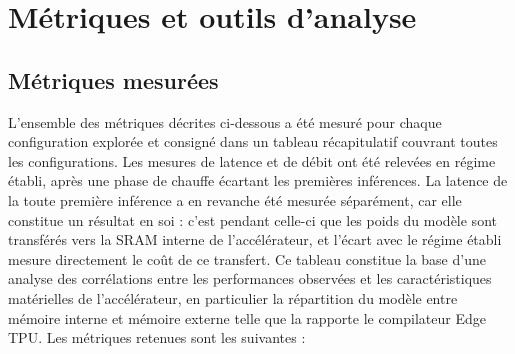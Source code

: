 \documentclass[11pt,a4paper]{report}
\begin{document}
\section{Métriques et outils d'analyse}
\label{sec:metriques}

\subsection{Métriques mesurées}

L'ensemble des métriques décrites ci-dessous a été mesuré pour chaque configuration explorée et consigné dans un tableau récapitulatif couvrant toutes les configurations. Les mesures de latence et de débit ont été relevées en régime établi, après une phase de chauffe écartant les premières inférences. La latence de la toute première inférence a en revanche été mesurée séparément, car elle constitue un résultat en soi : c'est pendant celle-ci que les poids du modèle sont transférés vers la SRAM interne de l'accélérateur, et l'écart avec le régime établi mesure directement le coût de ce transfert. Ce tableau constitue la base d'une analyse des corrélations entre les performances observées et les caractéristiques matérielles de l'accélérateur, en particulier la répartition du modèle entre mémoire interne et mémoire externe telle que la rapporte le compilateur Edge TPU. Les métriques retenues sont les suivantes :
\end{document}
